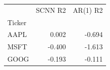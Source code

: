 \begin{tabular}{lrr}
\toprule
 & SCNN R2 & AR(1) R2 \\
Ticker &  &  \\
\midrule
AAPL & 0.002 & -0.694 \\
MSFT & -0.400 & -1.613 \\
GOOG & -0.193 & -0.111 \\
\bottomrule
\end{tabular}
